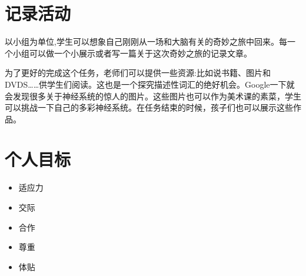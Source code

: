 \section{记录活动}
    以小组为单位,学生可以想象自己刚刚从一场和大脑有关的奇妙之旅中回来。每一个小组可以做一个小展示或者写一篇关于这次奇妙之旅的记录文章。\par
    为了更好的完成这个任务，老师们可以提供一些资源:比如说书籍、图片和DVDS……供学生们阅读。这也是一个探究描述性词汇的绝好机会。Google一下就会发现很多关于神经系统的惊人的图片。这些图片也可以作为美术课的素菜，学生可以挑战一下自己的多彩神经系统。在任务结束的时候，孩子们也可以展示这些作品。

\section{个人目标}
    \begin{itemize}
      \item 适应力
      \item 交际
      \item 合作  
      \item 尊重
      \item 体贴 
    \end{itemize}  

